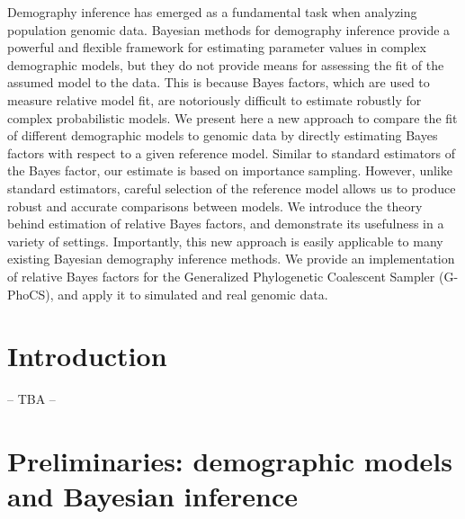 \documentclass[11pt]{article}
\begin{document}

Demography inference has emerged as a fundamental task when analyzing population genomic data.
%
Bayesian methods for demography inference provide a powerful and flexible framework for estimating
parameter values in complex demographic models, but they do not provide means for assessing the fit
of the assumed model to the data.
%
This is because Bayes factors, which are used to measure relative model fit, are notoriously difficult to estimate
robustly for complex probabilistic models.
%
We present here a new approach to compare the fit of different demographic models to genomic data
by directly estimating Bayes factors with respect to a given reference model.
%
Similar to standard estimators of the Bayes factor, our estimate is based on importance sampling.
%
However, unlike standard estimators, careful selection of the reference model allows us to produce
robust and accurate comparisons between models.
%
We introduce the theory behind estimation of relative Bayes factors, and demonstrate its usefulness in a variety of settings.
%
Importantly, this new approach is easily applicable to many existing Bayesian demography inference methods.
%
We provide an implementation of relative Bayes factors for the Generalized Phylogenetic Coalescent Sampler (G-PhoCS),
and apply it to simulated and real genomic data.


\setcounter{page}{1}

\section*{Introduction}

-- TBA --



\section*{Preliminaries: demographic models and Bayesian inference}
\end{document}
